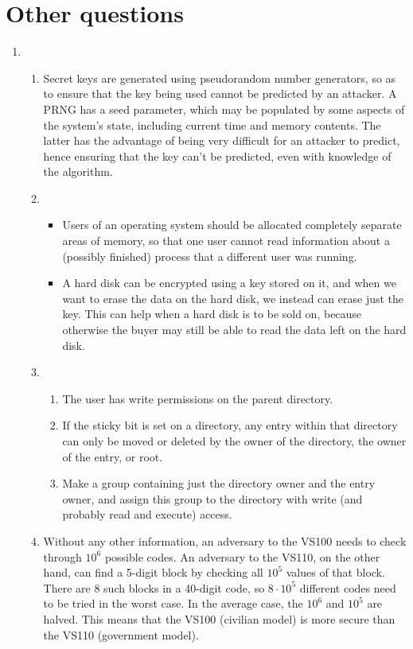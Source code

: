 \documentclass{article}
\begin{document}
\section*{Other questions}
\begin{enumerate}
  \item
    \begin{enumerate}
      \item Secret keys are generated using pseudorandom number generators, so as to ensure that the key being used cannot be predicted by an attacker. A PRNG has a seed parameter, which may be populated by some aspects of the system's state, including current time and memory contents. The latter has the advantage of being very difficult for an attacker to predict, hence ensuring that the key can't be predicted, even with knowledge of the algorithm.
      \item
        \begin{itemize}
          \item Users of an operating system should be allocated completely separate areas of memory, so that one user cannot read information about a (possibly finished) process that a different user was running.
          \item A hard disk can be encrypted using a key stored on it, and when we want to erase the data on the hard disk, we instead can erase just the key. This can help when a hard disk is to be sold on, because otherwise the buyer may still be able to read the data left on the hard disk.
        \end{itemize}
      \item
        \begin{enumerate}
          \item The user has write permissions on the parent directory.
          \item If the sticky bit is set on a directory, any entry within that directory can only be moved or deleted by the owner of the directory, the owner of the entry, or root.
          \item Make a group containing just the directory owner and the entry owner, and assign this group to the directory with write (and probably read and execute) access.
        \end{enumerate}
      \item Without any other information, an adversary to the VS100 needs to check through $10^6$ possible codes. An adversary to the VS110, on the other hand, can find a 5-digit block by checking all $10^5$ values of that block. There are 8 such blocks in a 40-digit code, so $8 \cdot 10^5$ different codes need to be tried in the worst case. In the average case, the $10^6$ and $10^5$ are halved. This means that the VS100 (civilian model) is more secure than the VS110 (government model).

\end{enumerate}
\end{enumerate}
\end{document}
